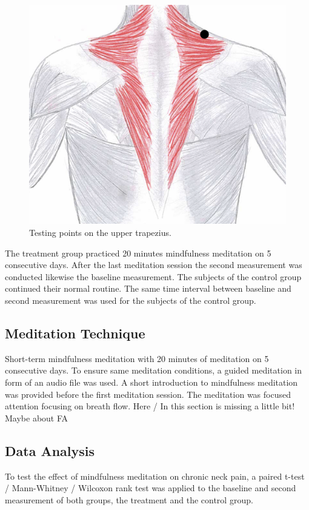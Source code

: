 \begin{figure}[H]
\centering
\includegraphics[width=.7\columnwidth]{../figures/trapezius}
\caption{Testing points on the upper trapezius.}
\label{fig:trapezius}
\end{figure} \vspace{-.5cm}

The treatment group practiced 20 minutes mindfulness meditation on 5 consecutive days. After the last meditation session the second measurement was conducted likewise the baseline measurement.
The subjects of the control group continued their normal routine. The same time interval between baseline and second measurement was used for the subjects of the control group.

\subsection{Meditation Technique}
Short-term mindfulness meditation with 20 minutes of meditation on 5 consecutive days.
To ensure same meditation conditions, a guided meditation in form of an audio file was used. A short introduction to mindfulness meditation was provided before the first meditation session. The meditation was focused attention focusing on breath flow.
Here / In this section is missing a little bit! Maybe about FA

\subsection{Data Analysis}
To test the effect of mindfulness meditation on chronic neck pain, a paired t-test / Mann-Whitney / Wilcoxon rank test was applied to the baseline and second measurement of both groups, the treatment and the control group.
